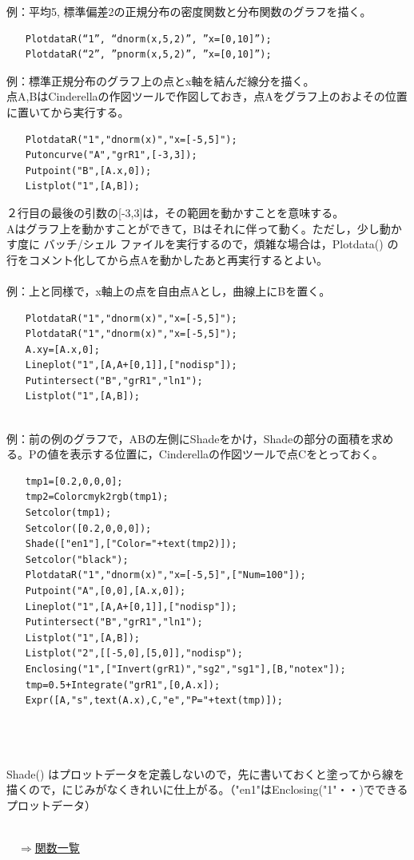 \documentclass[papersize,a4paper,12pt,uplatex]{jsarticle}
\begin{document}
\begin{description}
例：平均5, 標準偏差2の正規分布の密度関数と分布関数のグラフを描く。
\begin{verbatim}
　　PlotdataR(“1”, “dnorm(x,5,2)”, ”x=[0,10]”);
　　PlotdataR(“2”, ”pnorm(x,5,2)”, ”x=[0,10]”);
\end{verbatim}

例：標準正規分布のグラフ上の点とx軸を結んだ線分を描く。\\
点A,BはCinderellaの作図ツールで作図しておき，点Aをグラフ上のおよその位置に置いてから実行する。
\begin{verbatim}
　　PlotdataR("1","dnorm(x)","x=[-5,5]");
　　Putoncurve("A","grR1",[-3,3]);
　　Putpoint("B",[A.x,0]);
　　Listplot("1",[A,B]);
\end{verbatim}
２行目の最後の引数の[-3,3]は，その範囲を動かすことを意味する。\\
Aはグラフ上を動かすことができて，Bはそれに伴って動く。ただし，少し動かす度に バッチ/シェル ファイルを実行するので，煩雑な場合は，Plotdata() の行をコメント化してから点Aを動かしたあと再実行するとよい。\\
　\\
例：上と同様で，x軸上の点を自由点Aとし，曲線上にBを置く。
\begin{verbatim}
　　PlotdataR("1","dnorm(x)","x=[-5,5]");
　　PlotdataR("1","dnorm(x)","x=[-5,5]");
　　A.xy=[A.x,0];
　　Lineplot("1",[A,A+[0,1]],["nodisp"]);
　　Putintersect("B","grR1","ln1");
　　Listplot("1",[A,B]);
\end{verbatim}
　\\
例：前の例のグラフで，ABの左側にShadeをかけ，Shadeの部分の面積を求める。Pの値を表示する位置に，Cinderellaの作図ツールで点Cをとっておく。
\begin{verbatim}
　　tmp1=[0.2,0,0,0];
　　tmp2=Colorcmyk2rgb(tmp1);
　　Setcolor(tmp1);
　　Setcolor([0.2,0,0,0]);
　　Shade(["en1"],["Color="+text(tmp2)]);
　　Setcolor("black");
　　PlotdataR("1","dnorm(x)","x=[-5,5]",["Num=100"]);
　　Putpoint("A",[0,0],[A.x,0]);
　　Lineplot("1",[A,A+[0,1]],["nodisp"]);
　　Putintersect("B","grR1","ln1");
　　Listplot("1",[A,B]);
　　Listplot("2",[[-5,0],[5,0]],"nodisp");
　　Enclosing("1",["Invert(grR1)","sg2","sg1"],[B,"notex"]);
　　tmp=0.5+Integrate("grR1",[0,A.x]);
　　Expr([A,"s",text(A.x),C,"e","P="+text(tmp)]);
\end{verbatim}
　\\
　　\\
　\\
Shade() はプロットデータを定義しないので，先に書いておくと塗ってから線を描くので，にじみがなくきれいに仕上がる。（"en1"はEnclosing("1"・・)でできるプロットデータ）\\
　\\
\begin{flushright}　\hyperlink{functionlist}{$\Rightarrow$関数一覧}\end{flushright}


\end{description}
\end{document}
